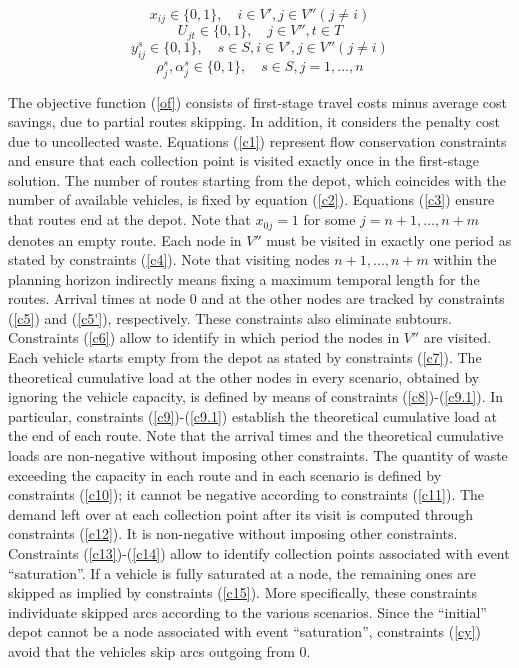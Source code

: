 \documentclass[preprint,11pt,authoryear]{elsarticle}
\begin{document}
%
\begin{equation}\label{c19}
x_{ij} \in \{0,1\}, \quad i \in V', j \in V'' (j\neq i)
\end{equation}
%
\begin{equation}\label{c20}
U_{jt} \in \{0,1\}, \quad j\in V'', t \in T
\end{equation}
%
\begin{equation}\label{c21}
y_{ij}^s \in \{0,1\}, \quad s \in S, i \in V', j \in V'' (j\neq i)
\end{equation}
%
\begin{equation}\label{c22}
\rho_j^s, \alpha_j^s \in \{0,1\}, \quad s \in S, j=1,...,n
\end{equation}

The objective function (\ref{of}) consists of first-stage travel costs minus average cost savings, due to partial routes skipping. In addition, it considers the penalty cost due to uncollected waste.  
Equations (\ref{c1}) represent flow conservation constraints and ensure that each collection point is visited exactly once in the first-stage solution. 
The number of routes starting from the depot, which coincides with the number of available vehicles, is fixed by equation (\ref{c2}). Equations (\ref{c3}) ensure that routes end at the depot. Note that $x_{0j}=1$ for some $j=n+1,...,n+m$ denotes an empty route.   
Each node in $V''$ must be visited in exactly one period as stated by constraints (\ref{c4}). Note that visiting nodes $n+1,...,n+m$ within the planning horizon indirectly means fixing a maximum temporal length for the routes. Arrival times at node 0 and at the other nodes are tracked by constraints  (\ref{c5}) and (\ref{c5'}), respectively. These constraints also eliminate subtours. Constraints  (\ref{c6}) allow to identify in which period the nodes in $V''$ are visited. 
Each vehicle starts empty from the depot as stated by constraints (\ref{c7}).
The theoretical cumulative load at the other nodes in every scenario, obtained by ignoring the vehicle capacity, is defined by means of constraints (\ref{c8})-(\ref{c9.1}). In particular, constraints (\ref{c9})-(\ref{c9.1}) establish the theoretical cumulative load at the end of each route. Note that the arrival times and the theoretical cumulative loads are non-negative without imposing other constraints.
The quantity of waste exceeding the capacity in each route and in each scenario is defined by constraints (\ref{c10}); it cannot be negative according to constraints (\ref{c11}).
The demand left over at each collection point after its visit is computed through constraints (\ref{c12}). It is non-negative without imposing other constraints. Constraints  (\ref{c13})-(\ref{c14}) allow to identify collection points associated with event ``saturation''. If a vehicle is fully saturated at a node, the remaining ones are skipped as implied by constraints (\ref{c15}). More specifically, these constraints individuate skipped arcs according to the various scenarios. Since the ``initial'' depot cannot be a node associated with event ``saturation'', constraints (\ref{cy}) avoid that the vehicles skip arcs outgoing from $0$.  
\end{document}
